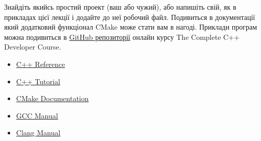 \documentclass[12pt]{article}
\begin{document}
	Знайдіть якийсь простий проект (ваш або чужий), або напишіть свій, як в прикладах цієї лекції і додайте до неї робочий  файл. Подивиться в документації який додатковий функціонал CMake може стати вам в нагоді. Приклади програм можна подивиться в \href{https://github.com/profjpbaugh/complete-cpp-developer-course}{GitHub репозиторії} онлайн курсу The Complete C++ Developer Course.
	
	
	\begin{itemize}
		\item \href{https://en.cppreference.com/w/cpp}{C++ Reference}
		\item \href{http://www.cplusplus.com/doc/tutorial/}{C++ Tutorial}
		\item \href{https://cmake.org/cmake/help/latest/}{CMake Documentation}
		\item \href{https://gcc.gnu.org/onlinedocs/gcc-12.2.0/gcc/}{GCC Manual}
		\item \href{https://releases.llvm.org/10.0.0/tools/clang/docs/index.html}{Clang Manual}
	\end{itemize}
	
	
\end{document}
